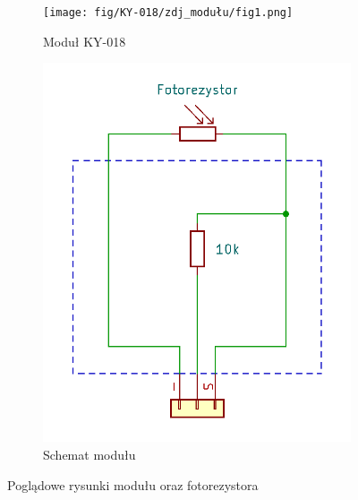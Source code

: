 \documentclass[11pt, a4paper]{article}
\begin{document}
\begin{figure}[h!]
\centering
\begin{subfigure}{.5\textwidth}
  \centering
  \texttt{[image: fig/KY-018/zdj\_modułu/fig1.png]}
  \caption{Moduł KY-018 \cite{ArduinoModules:Switch}}
  \label{fig:sub1}
\end{subfigure}%
\begin{subfigure}{.5\textwidth}
  \centering
  \includegraphics[width=0.6\linewidth]{fig/KY-018/zasada_dzialania/schemacik.png}
  \caption{Schemat modułu}
  \label{fig:sub2}
\end{subfigure}
\caption{Poglądowe rysunki modułu oraz fotorezystora}
\label{fig:test}
\end{figure}

\newpage
\end{document}
